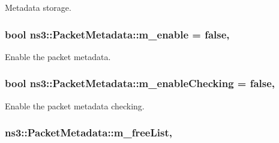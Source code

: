 Metadata storage. 

\subsubsection[{\texorpdfstring{m\+\_\+enable}{m_enable}}]{\setlength{\rightskip}{0pt plus 5cm}bool ns3\+::\+Packet\+Metadata\+::m\+\_\+enable = {\bf false}\hspace{0.3cm}{\ttfamily [static]}, {\ttfamily [private]}}\hypertarget{classns3_1_1PacketMetadata_a666ea556ffbd8f2226195cde1abe7ae7}{}\label{classns3_1_1PacketMetadata_a666ea556ffbd8f2226195cde1abe7ae7}


Enable the packet metadata. 

\subsubsection[{\texorpdfstring{m\+\_\+enable\+Checking}{m_enableChecking}}]{\setlength{\rightskip}{0pt plus 5cm}bool ns3\+::\+Packet\+Metadata\+::m\+\_\+enable\+Checking = {\bf false}\hspace{0.3cm}{\ttfamily [static]}, {\ttfamily [private]}}\hypertarget{classns3_1_1PacketMetadata_a3b4333cb8df79817e7ca74de1a090d89}{}\label{classns3_1_1PacketMetadata_a3b4333cb8df79817e7ca74de1a090d89}


Enable the packet metadata checking. 

\subsubsection[{\texorpdfstring{m\+\_\+free\+List}{m_freeList}}]{ ns3\+::\+Packet\+Metadata\+::m\+\_\+free\+List\hspace{0.3cm}{\ttfamily [static]}, {\ttfamily [private]}}\hypertarget{classns3_1_1PacketMetadata_aa646ed601542eec6bb98e6219165a7c8}{}\label{classns3_1_1PacketMetadata_aa646ed601542eec6bb98e6219165a7c8}


